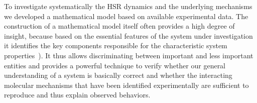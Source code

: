 \documentclass[oneside, 10pt, a4paper, twocolumn]{article}
\begin{document}
To investigate systematically the HSR dynamics and the underlying mechanisms we developed a mathematical model based on available experimental data. 
The construction of a mathematical model itself often provides a high degree of insight,
because based on the essential features of the system under investigation
it identifies the key components responsible for the characteristic
system properties~\cite{Pfau2011, Matuszynska2015}). It thus allows discriminating between important and less important entities
and provides a powerful technique to verify whether our general understanding of a system is
basically correct and whether the interacting molecular mechanisms that have been identified experimentally
are sufficient to reproduce and thus explain observed behaviors.
\end{document}
